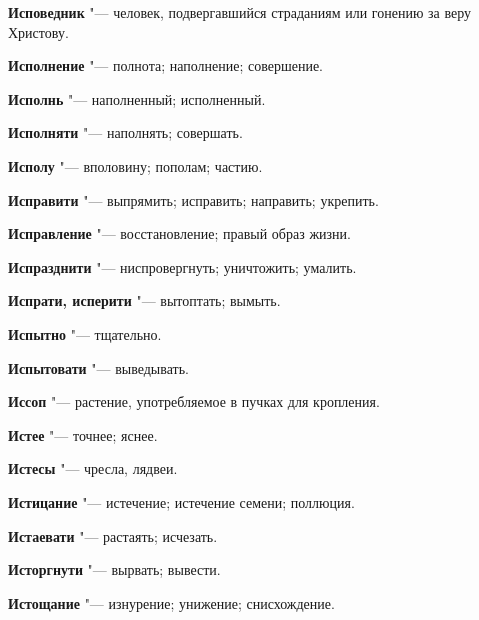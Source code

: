 \begin{mymulticols}{2}
\noindent\textbf{Исповедник} "--- человек, подвергавшийся страданиям или гонению за веру Христову. 




\noindent\textbf{Исполнение} "--- полнота; наполнение; совершение. 




\noindent\textbf{Исполнь} "--- наполненный; исполненный. 




\noindent\textbf{Исполняти} "--- наполнять; совершать. 




\noindent\textbf{Исполу} "--- вполовину; пополам; частию. 




\noindent\textbf{Исправити} "--- выпрямить; исправить; направить; укрепить. 




\noindent\textbf{Исправление} "--- восстановление; правый образ жизни. 




\noindent\textbf{Испразднити} "--- ниспровергнуть; уничтожить; умалить. 




\noindent\textbf{Испрати, исперити} "--- вытоптать; вымыть. 




\noindent\textbf{Испытно} "--- тщательно. 




\noindent\textbf{Испытовати} "--- выведывать. 




\noindent\textbf{Иссоп} "--- растение, употребляемое в пучках для кропления. 




\noindent\textbf{Истее} "--- точнее; яснее. 




\noindent\textbf{Истесы} "--- чресла, лядвеи. 




\noindent\textbf{Истицание} "--- истечение; истечение семени; поллюция. 




\noindent\textbf{Истаевати} "--- растаять; исчезать. 




\noindent\textbf{Исторгнути} "--- вырвать; вывести. 




\noindent\textbf{Истощание} "--- изнурение; унижение; снисхождение. 





\end{mymulticols}
